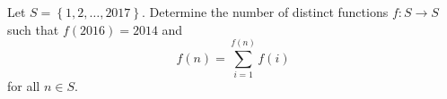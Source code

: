 Let $S=\left\{1,2,\ldots,2017\right\}$. Determine the number of distinct functions $f:S\to S$ such that $f\left(2016\right)=2014$ and \[f\left(n\right)=\displaystyle\sum_{i=1}^{f\left(n\right)}f\left(i\right)\] for all $n\in S$.